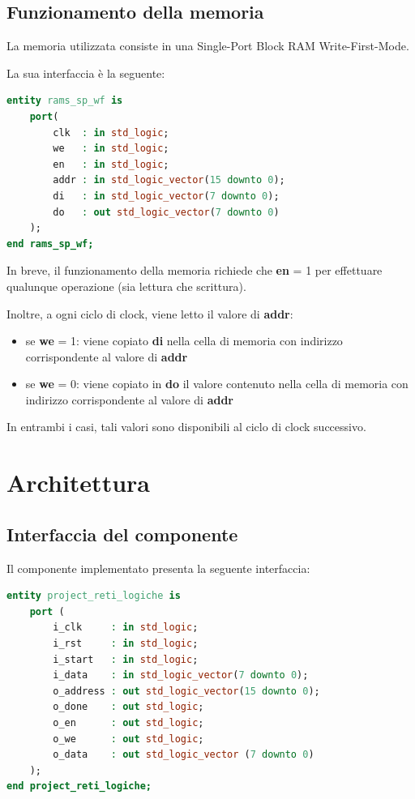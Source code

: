 \documentclass[a4paper, 12pt]{article}
\begin{document}
\newpage
\subsection{Funzionamento della memoria}
La memoria utilizzata consiste in una Single-Port Block RAM Write-First-Mode.

La sua interfaccia è la seguente:
\begin{lstlisting}[language=VHDL]
entity rams_sp_wf is
    port(
        clk  : in std_logic;
        we   : in std_logic;
        en   : in std_logic;
        addr : in std_logic_vector(15 downto 0);
        di   : in std_logic_vector(7 downto 0);
        do   : out std_logic_vector(7 downto 0)
    );
end rams_sp_wf;
\end{lstlisting}

\bigskip
In breve, il funzionamento della memoria richiede che \textbf{en} = 1 per effettuare qualunque operazione (sia lettura che scrittura). 

Inoltre, a ogni ciclo di clock, viene letto il valore di \textbf{addr}:

\begin{itemize}
    \item se \textbf{we} = 1: viene copiato \textbf{di} nella cella di memoria con indirizzo corrispondente al valore di \textbf{addr}
    \item se \textbf{we} = 0: viene copiato in \textbf{do} il valore contenuto nella cella di memoria con indirizzo corrispondente al valore di \textbf{addr}
\end{itemize}

\bigskip
In entrambi i casi, tali valori sono disponibili al ciclo di clock successivo.


\newpage
\section{Architettura}
\subsection{Interfaccia del componente}
Il componente implementato presenta la seguente interfaccia:

\begin{lstlisting}[language=VHDL]
entity project_reti_logiche is
    port (
        i_clk     : in std_logic;
        i_rst     : in std_logic;
        i_start   : in std_logic;
        i_data    : in std_logic_vector(7 downto 0);
        o_address : out std_logic_vector(15 downto 0);
        o_done    : out std_logic;
        o_en      : out std_logic;
        o_we      : out std_logic;
        o_data    : out std_logic_vector (7 downto 0)
    );
end project_reti_logiche;
\end{lstlisting}
\end{document}

